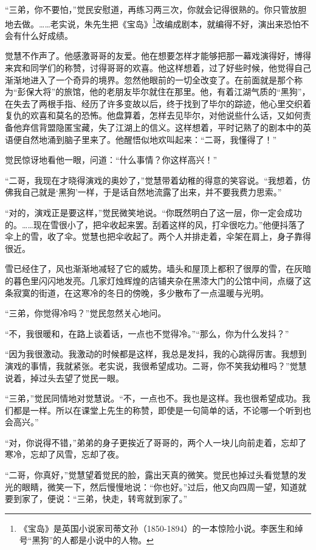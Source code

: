 \par “三弟，你不要怕，”觉民安慰道，再练习两三次，你就会记得很熟的。你只管放胆地去做。……老实说，朱先生把《宝岛》\footnote{《宝岛》是英国小说家司蒂文孙（1850-1894）的一本惊险小说。李医生和绰号“黑狗”的人都是小说中的人物。}改编成剧本，就编得不好，演出来恐怕不会有什么好成绩。
\par 觉慧不作声了。他感激哥哥的友爱。他在想要怎样才能够把那一幕戏演得好，博得来宾和同学们的称赞，讨得哥哥的欢喜。他这样想着，过了好些时候，他觉得自己渐渐地进入了一个奇异的境界。忽然他眼前的一切全改变了。在前面就是那个称为“彭保大将”的旅馆，他的老朋友毕尔就住在那里。他，有着江湖气质的“黑狗”，在失去了两根手指、经历了许多变故以后，终于找到了毕尔的踪迹，他心里交织着复仇的欢喜和莫名的恐怖。他盘算着，怎样去见毕尔，对他说些什么话，又如何责备他弃信背盟隐匿宝藏，失了江湖上的信义。这样想着，平时记熟了的剧本中的英语便自然地涌到脑子里来了。他醒悟似地欢叫起来：“二哥，我懂得了！”
\par 觉民惊讶地看他一眼，问道：“什么事情？你这样高兴！”
\par “二哥，我现在才晓得演戏的奥妙了，”觉慧带着幼稚的得意的笑容说。“我想着，仿佛我自己就是‘黑狗’一样，于是话自然地流露了出来，并不要我费力思索。”
\par “对的，演戏正是要这样，”觉民微笑地说。“你既然明白了这一层，你一定会成功的。……现在雪很小了，把伞收起来罢。刮着这样的风，打伞很吃力。”他便抖落了伞上的雪，收了伞。觉慧也把伞收起了。两个人并排走着，伞架在肩上，身子靠得很近。
\par 雪已经住了，风也渐渐地减轻了它的威势。墙头和屋顶上都积了很厚的雪，在灰暗的暮色里闪闪地发亮。几家灯烛辉煌的店铺夹杂在黑漆大门的公馆中间，点缀了这条寂寞的街道，在这寒冷的冬日的傍晚，多少散布了一点温暖与光明。
\par “三弟，你觉得冷吗？”觉民忽然关心地问。
\par “不，我很暖和，在路上谈着话，一点也不觉得冷。”“那么，你为什么发抖？”
\par “因为我很激动。我激动的时候都是这样，我总是发抖，我的心跳得厉害。我想到演戏的事情，我就紧张。老实说，我很希望成功。二哥，你不笑我幼稚吗？”觉慧说着，掉过头去望了觉民一眼。
\par “三弟，”觉民同情地对觉慧说。“不，一点也不。我也是这样。我也很希望成功。我们都是一样。所以在课堂上先生的称赞，即使是一句简单的话，不论哪一个听到也会高兴。”
\par “对，你说得不错，”弟弟的身子更挨近了哥哥的，两个人一块儿向前走着，忘却了寒冷，忘却了风雪，忘却了夜。
\par “二哥，你真好，”觉慧望着觉民的脸，露出天真的微笑。觉民也掉过头看觉慧的发光的眼睛，微笑一下，然后慢慢地说：“你也好。”过后，他又向四周一望，知道就要到家了，便说：“三弟，快走，转弯就到家了。”
